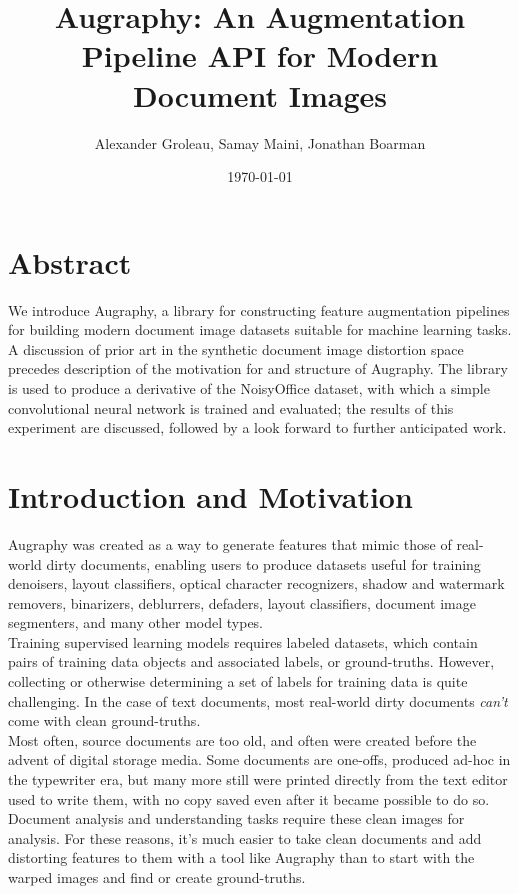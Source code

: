 \documentclass[runningheads]{article}
\author{Alexander Groleau, Samay Maini, Jonathan Boarman}
\date{\today}
\title{Augraphy: An Augmentation Pipeline API for Modern Document Images}
\begin{document}
\maketitle

\section{Abstract}
\label{sec:orgb8a4f58}
We introduce Augraphy, a library for constructing feature augmentation pipelines for building modern document image datasets suitable for machine learning tasks. A discussion of prior art in the synthetic document image distortion space precedes description of the motivation for and structure of Augraphy. The library is used to produce a derivative of the NoisyOffice dataset, with which a simple convolutional neural network is trained and evaluated; the results of this experiment are discussed, followed by a look forward to further anticipated work.

\section{Introduction and Motivation}
\label{sec:org1b677d2}
Augraphy was created as a way to generate features that mimic those of real-world dirty documents, enabling users to produce datasets useful for training denoisers, layout classifiers, optical character recognizers, shadow and watermark removers, binarizers, deblurrers, defaders, layout classifiers, document image segmenters, and many other model types.\\

Training supervised learning models requires labeled datasets, which contain pairs of training data objects and associated labels, or ground-truths. However, collecting or otherwise determining a set of labels for training data is quite challenging.  In the case of text documents, most real-world dirty documents \emph{can't} come with clean ground-truths.\\

Most often, source documents are too old, and often were created before the advent of digital storage media. Some documents are one-offs, produced ad-hoc in the typewriter era, but many more still were printed directly from the text editor used to write them, with no copy saved even after it became possible to do so. Document analysis and understanding tasks require these clean images for analysis. For these reasons, it's much easier to take clean documents and add distorting features to them with a tool like Augraphy than to start with the warped images and find or create ground-truths.
\end{document}
